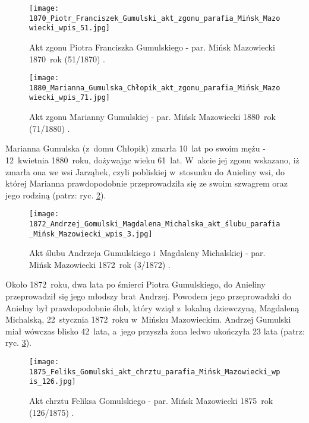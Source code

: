 \begin{figure}[!ht]
    \vspace*{0.5cm}
    \centering \texttt{[image: 
        1870\_Piotr\_Franciszek\_Gumulski\_akt\_zgonu\_parafia\_Mińsk\_Mazowiecki\_wpis\_51.jpg]}
    \captionsetup{format=hang}
    \caption{Akt zgonu Piotra Franciszka Gumulskiego - par. Mińsk Mazowiecki 
    1870~rok (51/1870) \cite{par_minsk2}.}
    \label{fig:pfgomulski_1870}
\end{figure}

\begin{figure}[!ht]
    \vspace*{0.5cm}
    \centering \texttt{[image: 
        1880\_Marianna\_Gumulska\_Chłopik\_akt\_zgonu\_parafia\_Mińsk\_Mazowiecki\_wpis\_71.jpg]}
    \captionsetup{format=hang}
    \caption{Akt zgonu Marianny Gumulskiej - par. Mińsk Mazowiecki 
    1880~rok (71/1880) \cite{par_minsk2}.}
    \label{fig:mgomulska_1880}
\end{figure}

Marianna Gumulska (z~domu Chłopik) zmarła 10~lat po swoim mężu - 12~kwietnia 
1880~roku, dożywając wieku 61~lat. W~akcie jej zgonu wskazano, iż 
zmarła ona we wsi Jarząbek, czyli pobliskiej w~stosunku do Anieliny wsi, do 
której Marianna prawdopodobnie przeprowadziła się  ze swoim szwagrem oraz jego
 rodziną (patrz: ryc. \ref{fig:mgomulska_1880}).

\begin{figure}[!ht]
    \vspace*{0.5cm}
    \centering \texttt{[image: 
        1872\_Andrzej\_Gomulski\_Magdalena\_Michalska\_akt\_ślubu\_parafia\_Mińsk\_Mazowiecki\_wpis\_3.jpg]}
    \captionsetup{format=hang}
    \caption{Akt ślubu Andrzeja Gumulskiego i~Magdaleny Michalskiej - par. 
    Mińsk Mazowiecki 1872~rok (3/1872) \cite{par_minsk2}.}
    \label{fig:agumulski_1872}
\end{figure}

Około 1872~roku, dwa lata po śmierci Piotra Gumulskiego, do Anieliny 
przeprowadził się jego młodszy brat Andrzej. Powodem jego przeprowadzki do 
Anielny był prawdopodobnie ślub, który wziął z~lokalną dziewczyną, Magdaleną 
Michalską, 22~stycznia 1872~roku w~Mińsku Mazowieckim. Andrzej Gumulski miał 
wówczas blisko 42~lata, a~jego przyszła żona ledwo ukończyła 23 lata (patrz: 
ryc. \ref{fig:agumulski_1872}). 

  \begin{figure}[!ht]
    \vspace*{0.5cm}
    \centering \texttt{[image: 
        1875\_Feliks\_Gomulski\_akt\_chrztu\_parafia\_Mińsk\_Mazowiecki\_wpis\_126.jpg]}
    \captionsetup{format=hang}
    \caption{Akt chrztu Feliksa Gomulskiego - par. Mińsk Mazowiecki 
    1875~rok (126/1875) \cite{par_minsk2}.}
    \label{fig:fgomulski_1875}
\end{figure}

